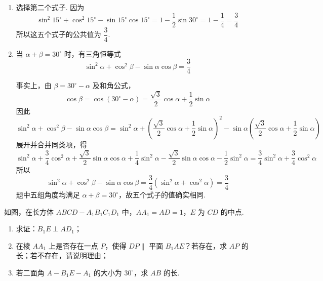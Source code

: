 \begin{solution}
\begin{enumerate}
\item 选择第二个式子. 因为
\[
\sin^{2}15^{\circ}+\cos^{2}15^{\circ}-\sin15^{\circ}\cos15^{\circ}
=1-\frac{1}{2}\sin30^{\circ}
=1-\frac{1}{4}
=\frac{3}{4}
\]
所以这五个式子的公共值为 \(\dfrac{3}{4}\).

\item 当 \(\alpha+\beta=30^{\circ}\) 时，有三角恒等式
\[
\sin^{2}\alpha+\cos^{2}\beta-\sin\alpha\cos\beta=\frac{3}{4}
\]

事实上，由 \(\beta=30^{\circ}-\alpha\) 及和角公式，
\[
\cos\beta=\cos\left(30^{\circ}-\alpha\right)
=\frac{\sqrt{3}}{2}\cos\alpha+\frac{1}{2}\sin\alpha
\]
因此
\[
\sin^{2}\alpha+\cos^{2}\beta-\sin\alpha\cos\beta
=\sin^{2}\alpha+\left(\frac{\sqrt{3}}{2}\cos\alpha+\frac{1}{2}\sin\alpha\right)^{2}
-\sin\alpha\left(\frac{\sqrt{3}}{2}\cos\alpha+\frac{1}{2}\sin\alpha\right)
\]
展开并合并同类项，得
\[
\sin^{2}\alpha+\frac{3}{4}\cos^{2}\alpha+\frac{\sqrt{3}}{2}\sin\alpha\cos\alpha+\frac{1}{4}\sin^{2}\alpha
-\frac{\sqrt{3}}{2}\sin\alpha\cos\alpha-\frac{1}{2}\sin^{2}\alpha
=\frac{3}{4}\sin^{2}\alpha+\frac{3}{4}\cos^{2}\alpha
\]
所以
\[
\sin^{2}\alpha+\cos^{2}\beta-\sin\alpha\cos\beta
=\frac{3}{4}\left(\sin^{2}\alpha+\cos^{2}\alpha\right)
=\frac{3}{4}
\]
题中五组角度均满足 \(\alpha+\beta=30^{\circ}\)，故五个式子的值确实相同.
\end{enumerate}
\end{solution}

\begin{problem}
如图，在长方体 \(ABCD-A_{1}B_{1}C_{1}D_{1}\) 中，\(AA_{1} = AD = 1\)，\(E\) 为 \(CD\) 的中点.

\begin{enumerate}
\item 求证：\(B_{1}E \perp AD_{1}\)；
\item 在棱 \(AA_{1}\) 上是否存在一点 \(P\)，使得 \(DP \parallel\) 平面 \(B_{1}AE\)？若存在，求 \(AP\) 的长；若不存在，请说明理由；
\item 若二面角 \(A-B_{1}E-A_{1}\) 的大小为 \(30^{\circ}\)，求 \(AB\) 的长.
\end{enumerate}

\end{problem}


